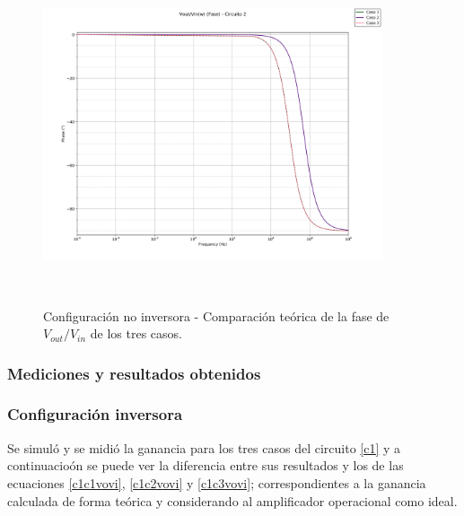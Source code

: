 \begin{figure}[H] %
\centering
\includegraphics[width=10cm,height=10cm,keepaspectratio]{../EJ1/00GRAFICOS/teoricos/circ2vovifasew.png}
\caption{Configuración no inversora - Comparaci\'on te\'orica de la fase de $V_{out}/V_{in}$ de los tres casos.}
\label{c2voviTeoPh}
\end{figure}






\subsubsection{Mediciones y resultados obtenidos} %

\subsubsection*{Configuraci\'on inversora}
Se simul\'o y se midi\'o la ganancia para los tres casos del circuito \ref{c1} y a continuacio\'on se puede ver la diferencia entre sus resultados y los de las ecuaciones \ref{c1c1vovi}, \ref{c1c2vovi} y \ref{c1c3vovi}; correspondientes a la ganancia calculada de forma te\'orica y considerando al amplificador operacional como ideal.

